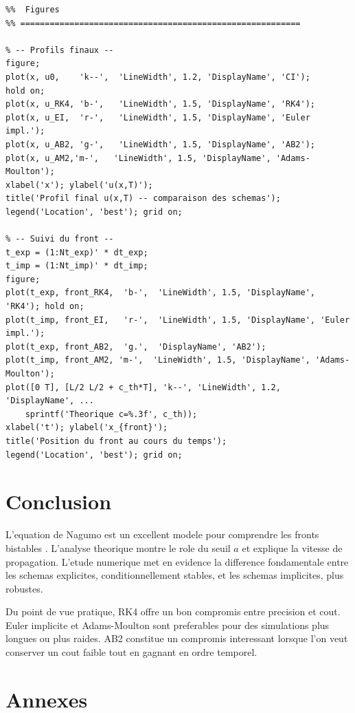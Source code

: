 \documentclass[11pt,a4paper]{report}
\begin{document}
\begin{lstlisting}[style=matlabstyle,caption={Script MATLAB principal : nagumo\_simulation.m}]
%% =========================================================
%%  Figures
%% =========================================================

% -- Profils finaux --
figure;
plot(x, u0,    'k--',  'LineWidth', 1.2, 'DisplayName', 'CI');
hold on;
plot(x, u_RK4, 'b-',   'LineWidth', 1.5, 'DisplayName', 'RK4');
plot(x, u_EI,  'r-',   'LineWidth', 1.5, 'DisplayName', 'Euler impl.');
plot(x, u_AB2, 'g-',   'LineWidth', 1.5, 'DisplayName', 'AB2');
plot(x, u_AM2,'m-',   'LineWidth', 1.5, 'DisplayName', 'Adams-Moulton');
xlabel('x'); ylabel('u(x,T)');
title('Profil final u(x,T) -- comparaison des schemas');
legend('Location', 'best'); grid on;

% -- Suivi du front --
t_exp = (1:Nt_exp)' * dt_exp;
t_imp = (1:Nt_imp)' * dt_imp;
figure;
plot(t_exp, front_RK4,  'b-',  'LineWidth', 1.5, 'DisplayName', 'RK4'); hold on;
plot(t_imp, front_EI,   'r-',  'LineWidth', 1.5, 'DisplayName', 'Euler impl.');
plot(t_exp, front_AB2,  'g.',  'DisplayName', 'AB2');
plot(t_imp, front_AM2, 'm-',  'LineWidth', 1.5, 'DisplayName', 'Adams-Moulton');
plot([0 T], [L/2 L/2 + c_th*T], 'k--', 'LineWidth', 1.2, 'DisplayName', ...
    sprintf('Theorique c=%.3f', c_th));
xlabel('t'); ylabel('x_{front}');
title('Position du front au cours du temps');
legend('Location', 'best'); grid on;
\end{lstlisting}

\chapter*{Conclusion}
L'equation de Nagumo est un excellent modele pour comprendre les fronts bistables \cite{Grindrod1988}.
L'analyse theorique montre le role du seuil $a$ et explique la vitesse de propagation.
L'etude numerique met en evidence la difference fondamentale entre les schemas explicites,
conditionnellement stables, et les schemas implicites, plus robustes.

Du point de vue pratique, RK4 offre un bon compromis entre precision et cout. Euler implicite
et Adams-Moulton sont preferables pour des simulations plus longues ou plus raides.
AB2 constitue un compromis interessant lorsque l'on veut conserver un cout faible tout
en gagnant en ordre temporel.

\chapter*{Annexes}
\end{document}
